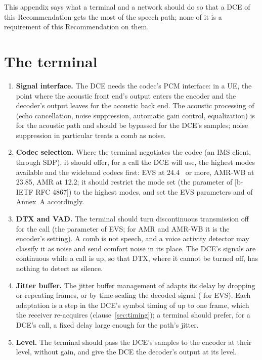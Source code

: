 

This appendix says what a terminal and a network should do so that a DCE
of this Recommendation gets the most of the speech path; none of it is a
requirement of this Recommendation on them.
\section{The terminal}
\begin{enumerate}[label=\alph*)]
\item \textbf{Signal interface.}  The DCE needs the codec's PCM
  interface: in a UE, the point where the acoustic front end's output
  enters the encoder and the decoder's output leaves for the acoustic
  back end.  The acoustic processing of  (echo cancellation,
  noise suppression, automatic gain control, equalization) is for the
  acoustic path and should be bypassed for the DCE's samples; noise
  suppression in particular treats a comb as noise.
\item \textbf{Codec selection.}  Where the terminal negotiates the codec
  (an IMS client, through SDP), it should offer, for a call the DCE will
  use, the highest modes available and the wideband codecs first: EVS at
  24.4~\kbs{} or more, AMR-WB at 23.85, AMR at 12.2; it should restrict
  the mode set (the  parameter of [b-IETF RFC 4867]) to
  the highest modes, and set the EVS parameters  and  of
   Annex~A accordingly.
\item \textbf{DTX and VAD.}  The terminal should turn discontinuous
  transmission off for the call (the  parameter of EVS; for AMR
  and AMR-WB it is the encoder's setting).  A comb is not speech, and a
  voice activity detector may classify it as noise and send comfort noise
  in its place.  The DCE's signals are continuous while a call is up, so
  that DTX, where it cannot be turned off, has nothing to detect as
  silence.
\item \textbf{Jitter buffer.}  The jitter buffer management of
   adapts its delay by dropping or repeating frames, or by
  time-scaling the decoded signal ( for EVS).  Each
  adaptation is a step in the DCE's symbol timing of up to one frame,
  which the receiver re-acquires (clause~\ref{sec:timing}); a terminal
  should prefer, for a DCE's call, a fixed delay large enough for the
  path's jitter.
\item \textbf{Level.}  The terminal should pass the DCE's samples to the
  encoder at their level, without gain, and give the DCE the decoder's
  output at its level.
\end{enumerate}
